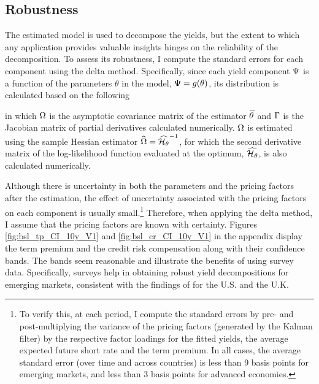 {\subsection{Robustness}
The estimated model is used to decompose the yields, but the extent to which 
any application provides valuable insights hinges on the reliability of the decomposition.
To assess its robustness, %
I compute the standard errors for each component using the delta method.
Specifically, since each yield component \(\Psi\) is a function of the parameters \(\theta\) in the model, \(\Psi = g(\theta) \), its distribution is calculated based on the following

\noindent in which \(\Omega\) is the asymptotic covariance matrix of the estimator \(\widehat{\theta}\) and \(\Gamma\) is the Jacobian matrix of partial derivatives calculated numerically. 
\(\Omega\) is estimated using the sample Hessian estimator \(\widehat{\Omega} = \widehat{\mathcal{H}_\theta}^{-1} \), for which the second derivative matrix of the log-likelihood function evaluated at the optimum, \(\widehat{\mathcal{H}_\theta}\), is also calculated numerically.%

Although there is uncertainty in both the parameters and the pricing factors after the estimation, the effect of uncertainty associated with the pricing factors on each component is usually small.\footnote{ To verify this, at each period, I compute the standard errors by pre- and post-multiplying the variance of the pricing factors (generated by the Kalman filter) by the respective factor loadings for the fitted yields, the average expected future short rate and the term premium. In all cases, the average standard error (over time and across countries) is less than 9 basis points for emerging markets, and less than 3 basis points for advanced economies.}
Therefore, when applying the delta method, I assume that the pricing factors are known with certainty. %
Figures \ref{fig:bsl_tp_CI_10y_V1} and \ref{fig:bsl_cr_CI_10y_V1} in the appendix display the term premium and the credit risk compensation along with their confidence bands. The bands seem reasonable and illustrate the benefits of using survey data. 
Specifically, surveys help in obtaining robust yield decompositions for emerging markets, consistent with the findings of \cite{Guimaraes:2014} for the U.S. and the U.K.


}
